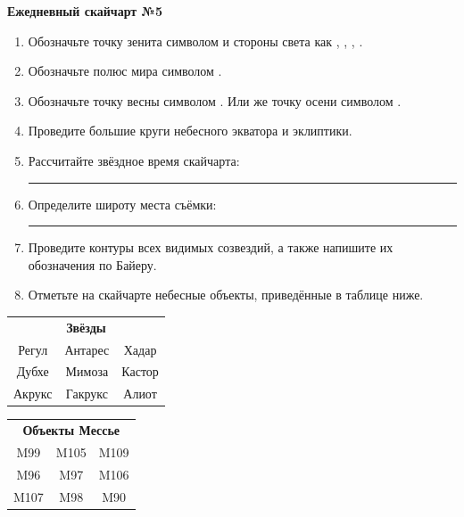 \documentclass{./SAS-class-skygen}
\begin{document}
    
    
    
	\begin{center}
		\large\textbf{Ежедневный скайчарт №5}
	\end{center}

	\begin{enumerate}
		\item Обозначьте точку зенита символом  и стороны света как , , , .
		\item Обозначьте полюс мира символом .
		\item Обозначьте точку весны символом \Aries. Или же точку осени символом \Libra.
		\item Проведите большие круги небесного экватора и эклиптики.
		\item Рассчитайте звёздное время скайчарта: \rule{2cm}{0.4pt}
		\item Определите широту места съёмки: \rule{2cm}{0.4pt}
		\item Проведите контуры всех видимых созвездий, а также напишите их обозначения по Байеру.
		\item Отметьте на скайчарте небесные объекты, приведённые в таблице ниже.
	\end{enumerate}
	
    \vspace{0.5cm}

    \begin{table}[h!]
    \centering
    \begin{tabular}{ccc}
    \multicolumn{3}{c}{\textbf{Звёзды}} \\ Регул & Антарес & Хадар \\
Дубхе & Мимоза & Кастор \\
Акрукс & Гакрукс & Алиот \\

\end{tabular}
    \hfill
    \begin{tabular}{ccc}
    \multicolumn{3}{c}{\textbf{Объекты Мессье}} \\ M99 & M105 & M109 \\
M96 & M97 & M106 \\
M107 & M98 & M90 \\

\end{tabular}
    \end{table}
	
\end{document}
